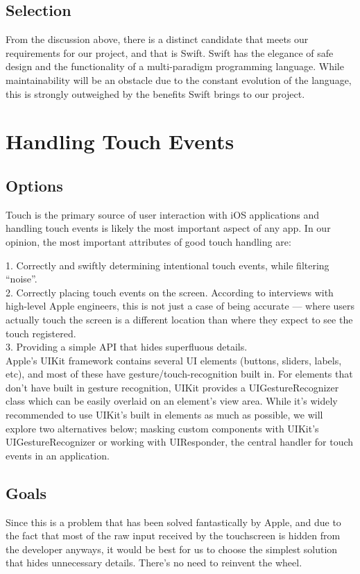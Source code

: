 \documentclass[letterpaper,10pt,titlepage]{article}
\begin{document}
\subsection{Selection}

From the discussion above, there is a distinct candidate that meets our requirements for our project, and that is Swift. Swift has the elegance of safe design and the functionality of a multi-paradigm programming language. While maintainability will be an obstacle due to the constant evolution of the language, this is strongly outweighed by the benefits Swift brings to our project.

\section{Handling Touch Events}

\subsection{Options}
Touch is the primary source of user interaction with iOS applications and handling touch events is likely the most important aspect of any app. In our opinion, the most important attributes of good touch handling are:

1. Correctly and swiftly determining intentional touch events, while filtering “noise”.\\
2. Correctly placing touch events on the screen. According to interviews with high-level Apple engineers\cite{touchpara1}, this is not just a case of being accurate — where users actually touch the screen is a different location than where they expect to see the touch registered.\\
3. Providing a simple API that hides superfluous details.\\

Apple’s UIKit framework contains several UI elements (buttons, sliders, labels, etc), and most of these have gesture/touch-recognition built in. For elements that don’t have built in gesture recognition, UIKit provides a UIGestureRecognizer class which can be easily overlaid on an element’s view area.
While it’s widely recommended to use UIKit’s built in elements as much as possible, we will explore two alternatives below; masking custom components with UIKit's UIGestureRecognizer or working with UIResponder, the central handler for touch events in an application.

\subsection{Goals}
Since this is a problem that has been solved fantastically by Apple, and due to the fact that most of the raw input received by the touchscreen is hidden from the developer anyways, it would be best for us to choose the simplest solution that hides unnecessary details. There's no need to reinvent the wheel.
\end{document}
